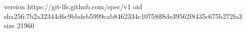 version https://git-lfs.github.com/spec/v1
oid sha256:7b2a32344d6c9bbdeb5999cab8462334c10758ff8de39562f8435c675b272fa3
size 21960
